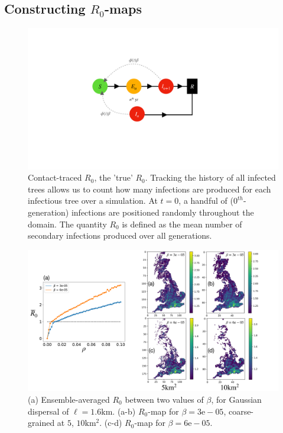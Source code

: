 \subsection{Constructing $R_0$-maps}
\begin{figure}
    \centering
    \includegraphics[scale=0.30]{chapter6/figures/fig1.pdf}
    \caption{Contact-traced $R_0$, the 'true' $R_0$. Tracking the history of all infected trees allows us to count how many infections are produced for each infectious tree over a simulation. At $t=0$, a handful of ($0^{th}$-generation) infections are positioned randomly throughout the domain. The quantity $R_0$ is defined as the mean number of secondary infections produced over all generations.}
    \label{fig:my_label}
\end{figure}

\begin{figure}
    \centering
    \includegraphics[scale=0.25]{chapter6/figures/fig2.pdf}
      \caption{(a) Ensemble-averaged $R_0$ between two values of $\beta$, for Gaussian dispersal of $\ell=1.6\mathrm{km}$. (a-b) $R_0$-map for $\beta=3\mathrm{e}-05$, coarse-grained at $5$, $ 10\mathrm{km^2}$. (c-d) $R_0$-map for $\beta=6\mathrm{e}-05$.}
    \label{fig:my_label}
\end{figure}

